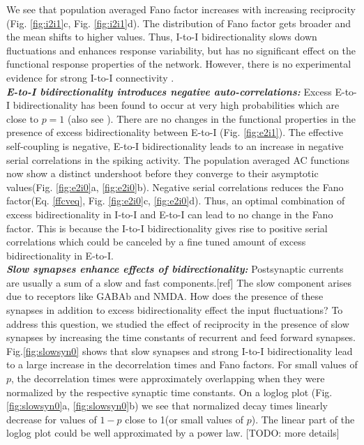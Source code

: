 We see that population averaged Fano factor increases with increasing reciprocity (Fig. \ref{fig:i2i1}c, Fig. \ref{fig:i2i1}d). The distribution of Fano factor  gets broader and the mean shifts to higher values. Thus, I-to-I bidirectionality slows down fluctuations and enhances response variability, but has no significant effect on the functional response properties of the network. However, there is no experimental evidence for strong I-to-I connectivity \cite{Avermann2012}.\\ 

\emph{\textbf{E-to-I bidirectionality introduces negative auto-correlations:}} Excess E-to-I bidirectionality has been found to occur at very high probabilities which are close to $p=1$ \cite{Yoshimura2005, Otsuka2009}(also see \cite{Avermann2012}). There are no changes in the functional properties in the presence of excess bidirectionality between E-to-I (Fig. \ref{fig:e2i1}). The effective self-coupling is negative, E-to-I bidirectionality leads to an increase in negative serial correlations in the spiking activity. The population averaged AC functions now show a distinct undershoot before they converge to their asymptotic values(Fig. \ref{fig:e2i0}a, \ref{fig:e2i0}b). Negative serial correlations reduces the Fano factor(Eq. \ref{ffcveq}, Fig. \ref{fig:e2i0}c, \ref{fig:e2i0}d). Thus, an optimal combination of excess bidirectionality in I-to-I and E-to-I can lead to no change in the Fano factor. This is because the I-to-I bidirectionality gives rise to positive serial correlations which could be canceled by a fine tuned amount of excess bidirectionality in E-to-I. \\

\emph{\textbf{Slow synapses enhance effects of bidirectionality:}} Postsynaptic currents are usually a sum of a slow and fast components.[ref] The slow component arises due to receptors like GABAb and NMDA. How does the presence of these synapses in addition to excess bidirectionality effect the input fluctuations? To address this question, we studied the effect of reciprocity in the presence of slow synapses by increasing the time constants of recurrent and feed forward synapses. Fig.\ref{fig:slowsyn0} shows that slow synapses and strong I-to-I bidirectionality lead to a large increase in the decorrelation times and Fano factors. For small values of $p$, the decorrelation times were approximately overlapping when they were normalized by the respective synaptic time constants. On a loglog plot (Fig. \ref{fig:slowsyn0}a, \ref{fig:slowsyn0}b) we see that normalized decay times linearly decrease for values of $1-p$ close to 1(or small values of $p$). The linear part of the loglog plot could be well approximated by a power law. [TODO: more details]\\ 

